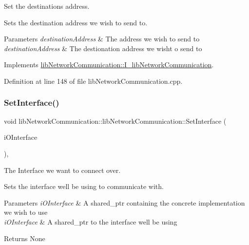 Set the destination\textquotesingle{}s address. 

Sets the destination address we wish to send to.


\begin{DoxyParams}{Parameters}
{\em destination\+Address} & The address we wish to send to\\
\hline
{\em destination\+Address} & The destionation address we wisht o send to \\
\hline
\end{DoxyParams}


Implements \mbox{\hyperlink{classlibNetworkCommunication_1_1I__libNetworkCommunication_ad156b40d434a15fb553873f892dd2d0c}{lib\+Network\+Communication\+::\+I\+\_\+lib\+Network\+Communication}}.



Definition at line 148 of file lib\+Network\+Communication.\+cpp.

\mbox{\label{classlibNetworkCommunication_1_1libNetworkCommunication_a842d3bfc24ffe5175431f8aad5905266}} 
\subsubsection{\texorpdfstring{SetInterface()}{SetInterface()}}
{\footnotesize\ttfamily void lib\+Network\+Communication\+::lib\+Network\+Communication\+::\+Set\+Interface (\begin{DoxyParamCaption}\item[{std\+::shared\+\_\+ptr$<$ \mbox{\hyperlink{classcFunctions_1_1I__cNetComm}{c\+Functions\+::\+I\+\_\+c\+Net\+Comm}} $>$}]{i\+O\+Interface }\end{DoxyParamCaption})\hspace{0.3cm}{\ttfamily [override]}, {\ttfamily [virtual]}}



The Interface we want to connect over. 

Sets the interface we\textquotesingle{}ll be using to communicate with.


\begin{DoxyParams}{Parameters}
{\em i\+O\+Interface} & A shared\+\_\+ptr containing the concrete implementation we wish to use\\
\hline
{\em i\+O\+Interface} & A shared\+\_\+ptr to the interface we\textquotesingle{}ll be using\\
\hline
\end{DoxyParams}
\begin{DoxyReturn}{Returns}
None 
\end{DoxyReturn}


